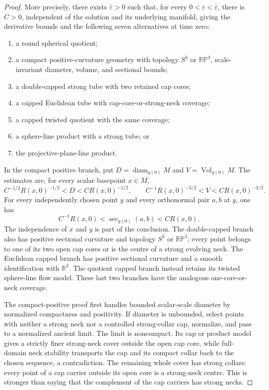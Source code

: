 \begin{proof}
More precisely, there exists $\bar\varepsilon>0$ such that, for every
$0<\varepsilon<\bar\varepsilon$, there is $C>0$, independent of the solution
and its underlying manifold, giving the derivative bounds and the following
seven alternatives at time zero:
\begin{enumerate}
\item a round spherical quotient;
\item a compact positive-curvature geometry with topology $S^3$ or
      $\mathbb{RP}^3$, scale-invariant diameter, volume, and sectional bounds;
\item a double-capped strong tube with two retained cap cores;
\item a capped Euclidean tube with cap-core-or-strong-neck coverage;
\item a capped twisted quotient with the same coverage;
\item a sphere-line product with a strong tube; or
\item the projective-plane-line product.
\end{enumerate}
In the compact positive branch, put $D=\operatorname{diam}_{g(0)}M$ and
$V=\operatorname{Vol}_{g(0)}M$.  The estimates are, for every scalar basepoint
$x\in M$,
\[
 C^{-1/2}R(x,0)^{-1/2}<D<CR(x,0)^{-1/2},\qquad
 C^{-1}R(x,0)^{-3/2}<V<CR(x,0)^{-3/2}.
\]
For every independently chosen point $y$ and every orthonormal pair $a,b$ at
$y$, one has
\[
 C^{-1}R(x,0)<\operatorname{sec}_{g(0)}(a,b)<CR(x,0).
\]
The independence of $x$ and $y$ is part of the conclusion.  The double-capped
branch also has positive sectional curvature and topology $S^3$ or
$\mathbb{RP}^3$; every point belongs to one of its two open cap cores or is
the centre of a strong evolving neck.  The Euclidean capped branch has
positive sectional curvature and a smooth identification with $\mathbb R^3$.
The quotient capped branch instead retains its twisted sphere-line flow
model.  These last two branches have the analogous one-core-or-neck coverage.

The compact-positive proof first handles bounded scalar-scale diameter by
normalized compactness and positivity.  If diameter is unbounded, select
points with neither a strong neck nor a controlled strong-collar cap, normalize,
and pass to a normalized ancient limit.  The limit is noncompact.  Its cap or product model
gives a strictly finer strong-neck cover outside the open cap core, while
full-domain neck stability transports the cap and its compact collar back to
the chosen sequence, a contradiction.  The remaining whole cover has strong
collars: every point of a cap carrier outside its open core is a strong-neck
centre.  This is stronger than saying that the complement of the cap carriers
has strong necks.


\end{proof}
